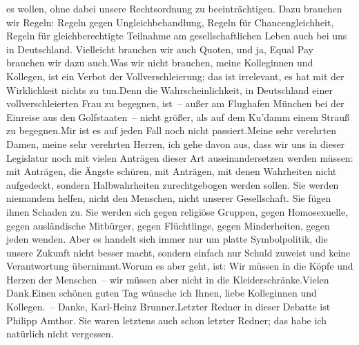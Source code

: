 \documentclass{article}
\begin{document}
es wollen, ohne dabei unsere Rechtsordnung zu beeinträchtigen. Dazu brauchen wir Regeln: Regeln gegen Ungleichbehandlung, Regeln für Chancengleichheit, Regeln für gleichberechtigte Teilnahme am gesellschaftlichen Leben auch bei uns in Deutschland. Vielleicht brauchen wir auch Quoten, und ja, Equal Pay brauchen wir dazu auch.Was wir nicht brauchen, meine Kolleginnen und Kollegen, ist ein Verbot der Vollverschleierung; das ist irrelevant, es hat mit der Wirklichkeit nichts zu tun.Denn die Wahrscheinlichkeit, in Deutschland einer vollverschleierten Frau zu begegnen, ist – außer am Flughafen München bei der Einreise aus den Golfstaaten – nicht größer, als auf dem Ku’damm einem Strauß zu begegnen.Mir ist es auf jeden Fall noch nicht passiert.Meine sehr verehrten Damen, meine sehr verehrten Herren, ich gehe davon aus, dass wir uns in dieser Legislatur noch mit vielen Anträgen dieser Art auseinandersetzen werden müssen: mit Anträgen, die Ängste schüren, mit Anträgen, mit denen Wahrheiten nicht aufgedeckt, sondern Halbwahrheiten zurechtgebogen werden sollen. Sie werden niemandem helfen, nicht den Menschen, nicht unserer Gesellschaft. Sie fügen ihnen Schaden zu. Sie werden sich gegen religiöse Gruppen, gegen Homosexuelle, gegen ausländische Mitbürger, gegen Flüchtlinge, gegen Minderheiten, gegen jeden wenden. Aber es handelt sich immer nur um platte Symbolpolitik, die unsere Zukunft nicht besser macht, sondern einfach nur Schuld zuweist und keine Verantwortung übernimmt.Worum es aber geht, ist: Wir müssen in die Köpfe und Herzen der Menschen – wir müssen aber nicht in die Kleiderschränke.Vielen Dank.Einen schönen guten Tag wünsche ich Ihnen, liebe Kolleginnen und Kollegen. – Danke, Karl-Heinz Brunner.Letzter Redner in dieser Debatte ist Philipp Amthor. Sie waren letztens auch schon letzter Redner; das habe ich natürlich nicht vergessen.
\end{document}
